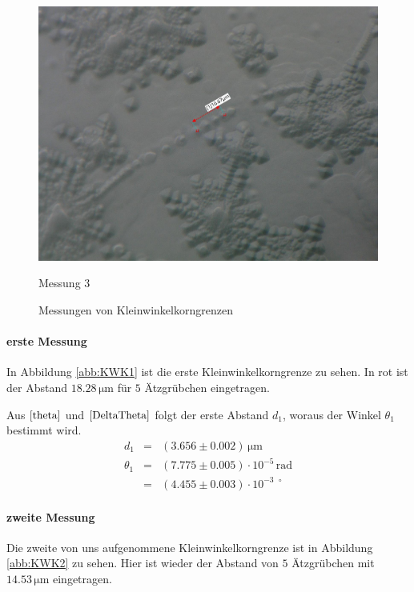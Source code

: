 \documentclass[12pt,a4paper]{scrartcl}
\numberwithin{equation}{section} %
\begin{document}
\begin{figure}[h]
\begin{minipage}[t]{.31\linewidth}
		\includegraphics[width=\textwidth]{../media/B2.8/KWK3_tempered.pdf}
		\caption{Messung 3}
		\label{abb:KWK3}
	\end{minipage}
	\caption*{Messungen von Kleinwinkelkorngrenzen}
\end{figure}


\hypertarget{erste-messung}{%
\paragraph*{erste Messung}\label{erste-messung}}

In Abbildung \ref{abb:KWK1} ist die erste Kleinwinkelkorngrenze zu sehen. In
rot ist der Abstand $18.28 \mathrm{\, \mu m}$ für $5$ Ätzgrübchen
eingetragen.

Aus $\eqref{theta}$ und $\eqref{DeltaTheta}$ folgt der erste Abstand
$d_1$, woraus der Winkel $\theta_1$ bestimmt wird.
\begin{eqnarray}
    d_1 &=& (3.656 \pm 0.002) \mathrm{\, \mu m} \\
    \theta_1 &=& (7.775 \pm 0.005) \cdot 10^{-5} \mathrm{\, rad} \\
        &=& (4.455 \pm 0.003) \cdot 10^{-3\ \ \circ}
\end{eqnarray}

\hypertarget{zweite-messung}{%
\paragraph*{zweite Messung}\label{zweite-messung}}

Die zweite von uns aufgenommene Kleinwinkelkorngrenze ist in Abbildung
\ref{abb:KWK2} zu sehen. Hier ist wieder der Abstand von $5$ Ätzgrübchen mit
$14.53 \mathrm{\, \mu m}$ eingetragen.
\end{document}

